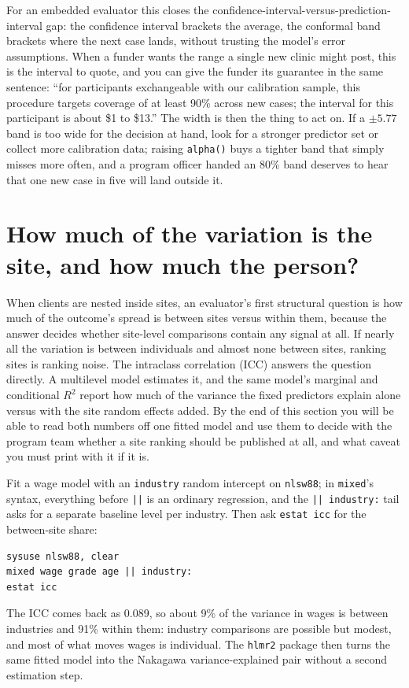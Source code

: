 \documentclass[
    a4paper,
    fontsize=10pt,
    twoside=true,
    numbers=noenddot,
]{kaobook}
\begin{document}
For an embedded evaluator this closes the confidence-interval-versus-prediction-interval gap: the confidence interval brackets the average, the conformal band brackets where the next case lands, without trusting the model's error assumptions. When a funder wants the range a single new clinic might post, this is the interval to quote, and you can give the funder its guarantee in the same sentence: \enquote{for participants exchangeable with our calibration sample, this procedure targets coverage of at least 90\% across new cases; the interval for this participant is about \$1 to \$13.} The width is then the thing to act on. If a $\pm 5.77$ band is too wide for the decision at hand, look for a stronger predictor set or collect more calibration data; raising \texttt{alpha()} buys a tighter band that simply misses more often, and a program officer handed an 80\% band deserves to hear that one new case in five will land outside it.

\section{How much of the variation is the site, and how much the person?}\label{sec:icc}
When clients are nested inside sites, an evaluator's first structural question is how much of the outcome's spread is between sites versus within them, because the answer decides whether site-level comparisons contain any signal at all. If nearly all the variation is between individuals and almost none between sites, ranking sites is ranking noise. The intraclass correlation (ICC) answers the question directly. A multilevel model estimates it, and the same model's marginal and conditional $R^2$ \parencite{nakagawa2013general} report how much of the variance the fixed predictors explain alone versus with the site random effects added. By the end of this section you will be able to read both numbers off one fitted model and use them to decide with the program team whether a site ranking should be published at all, and what caveat you must print with it if it is.

Fit a wage model with an \texttt{industry} random intercept on \texttt{nlsw88}; in \texttt{mixed}'s syntax, everything before \texttt{||} is an ordinary regression, and the \texttt{|| industry:} tail asks for a separate baseline level per industry. Then ask \texttt{estat icc} for the between-site share:
\par
{\footnotesize
\begin{verbatim}
sysuse nlsw88, clear
mixed wage grade age || industry:
estat icc
\end{verbatim}
}
The ICC comes back as 0.089, so about 9\% of the variance in wages is between industries and 91\% within them: industry comparisons are possible but modest, and most of what moves wages is individual. The \texttt{hlmr2} package then turns the same fitted model into the Nakagawa variance-explained pair without a second estimation step.
\end{document}
